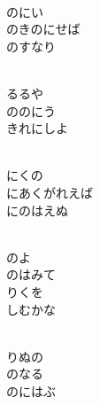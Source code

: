 \documentclass[10pt,b5j]{tarticle} %
\begin{document}
\vspace{1.5em} %
\newcommand{\linespace}{0.5em} %
\newcommand{\blocksize}{0.5\hsize} %
\newcommand{\itemmargin}{6em} %
\begin{enumerate} %
    \setlength{\itemindent}{\itemmargin} %
    \begin{minipage}[c]{\blocksize}
    
        \vspace{\linespace}
        \item~\\
        のにい\\
        のきのにせば\\
        のすなり
        
        \vspace{\linespace}
        \item~\\
        るるや\\
        ののにう\\
        きれにしよ
        
        \vspace{\linespace}
        \item~\\
        にくの\\
        にあくがれえば\\
        にのはえぬ
        
        \vspace{\linespace}
        \item~\\
        のよ\\
        のはみて\\
        りくを\\
        しむかな
        
        \vspace{\linespace}
        \item~\\
        りぬの\\
        のなる\\
        のにはぶ
    
    \end{minipage}
\end{enumerate} %
\end{document}
